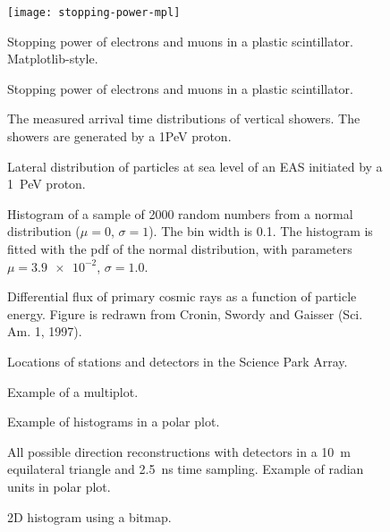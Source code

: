 \documentclass[a4paper,11pt]{article}
\begin{document}
\begin{figure}
\centering
\texttt{[image: stopping-power-mpl]}
\caption{Stopping power of electrons and muons in a plastic scintillator.
Matplotlib-style.}
\end{figure}

\begin{figure}
\centering

\caption{Stopping power of electrons and muons in a plastic scintillator.}
\end{figure}

\begin{figure}
\centering
{
}
\caption{The measured arrival time distributions of vertical showers. The
showers are generated by a 1PeV proton.}
\end{figure}

\begin{figure}
\centering

\caption{Lateral distribution of particles at sea level of an EAS
initiated by a \SI{1}{\peta\electronvolt} proton.}
\end{figure}

\begin{figure}
\centering

\caption{Histogram of a sample of \num{2000} random numbers from a normal
distribution ($\mu = 0$, $\sigma = 1$).  The bin width is \num{.1}.  The
histogram is fitted with the pdf of the normal distribution, with
parameters $\mu = \num{3.9e-2}$, $\sigma=\num{1.0}$.}
\end{figure}

\begin{figure}
\centering

\caption{Differential flux of primary cosmic rays as a function of
particle energy.  Figure is redrawn from Cronin, Swordy and Gaisser (Sci.
Am. 1, 1997).}
\end{figure}

\begin{figure}
\centering
{
}
\caption{Locations of stations and detectors in the Science Park Array.}
\end{figure}

\begin{figure}
\centering

\caption{Example of a multiplot.}
\end{figure}

\begin{figure}
\centering

\caption{Example of histograms in a polar plot.}
\end{figure}

\begin{figure}
\centering

\caption{All possible direction reconstructions with detectors in a
\SI{10}{\meter} equilateral triangle and \SI{2.5}{\nano\second} time
sampling. Example of radian units in polar plot.}
\end{figure}

\begin{figure}
\centering

\caption{2D histogram using a bitmap.}
\end{figure}
\end{document}
